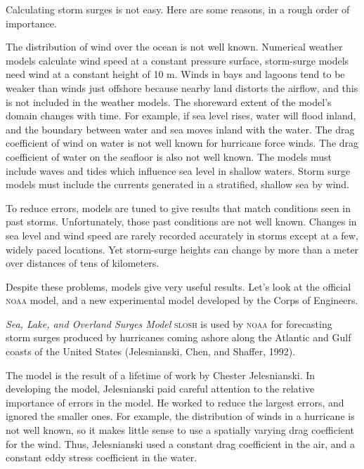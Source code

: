 Calculating storm surges is not easy. Here are some reasons, in a rough order of importance.
\begin{enumerate}
\vitem The distribution of wind over the ocean is not well known. Numerical weather models calculate wind speed at a constant pressure surface, storm-surge models need wind at a constant height of 10 m. Winds in bays and lagoons tend to be weaker than winds just offshore because nearby land distorts the airflow, and this is not included in the weather models.
\vitem The shoreward extent of the model's domain changes with time. For example, if sea level rises, water will flood inland, and the boundary between water and sea moves inland with the water.
\vitem The drag coefficient of wind on water is not well known for hurricane force winds.
\vitem The drag coefficient of water on the seafloor is also not well known.
\vitem The models must include waves and tides which influence sea level in shallow waters.
\vitem Storm surge models must include the currents generated in a stratified, shallow sea by wind.
\end{enumerate}
To reduce errors, models are tuned to give results that match conditions seen in past storms. Unfortunately, those past conditions are not well known. Changes in sea level and wind speed are rarely recorded accurately in storms except at a few, widely paced locations. Yet storm-surge heights can change by more than a meter over distances of tens of kilometers.

Despite these problems, models give very useful results. Let's look at the official \textsc{noaa} model, and a new experimental model developed by the Corps of Engineers.

\textit{Sea, Lake, and Overland Surges Model} \textsc{slosh} is used by \textsc{noaa}
for
forecasting storm surges produced by hurricanes coming ashore along the Atlantic and Gulf
coasts of the United States (Jelesnianski, Chen, and Shaffer, 1992).

The model is the result of a lifetime of work by Chester Jelesnianski. In
developing the model, Jelesnianski paid careful attention to the relative
importance of errors in the model. He worked to reduce the largest errors, and
ignored the smaller ones. For example, the distribution of winds in a hurricane
is not well known, so it makes little sense to use a spatially
varying drag coefficient for the wind. Thus, Jelesnianski used a
constant drag coefficient in the air, and a constant eddy stress
coefficient in the water.

